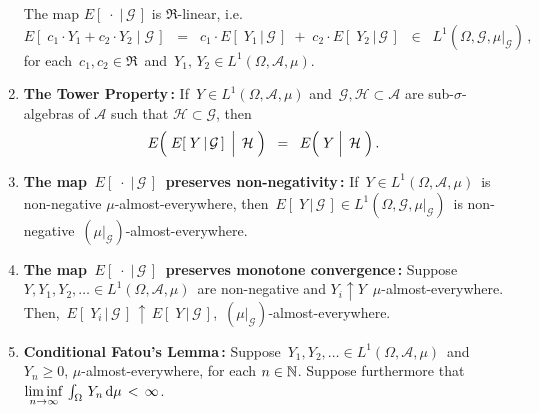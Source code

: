 \begin{theorem}
\begin{enumerate}
	The map $E\!\left[\;\cdot\;\vert\,\mathcal{G}\,\right]$ is $\Re$-linear, i.e.
	\begin{equation*}
	E\!\left[\;c_{1}\cdot Y_{1} + c_{2}\cdot Y_{2}\;\vert\;\mathcal{G}\,\right]
	\;\; = \;\;
	c_{1}\cdot E\!\left[\;Y_{1}\,\vert\,\mathcal{G}\,\right]
	\; + \;
	c_{2}\cdot E\!\left[\;Y_{2}\,\vert\,\mathcal{G}\,\right]
	\;\; \in \;\; L^{1}\!\left(\Omega,\mathcal{G},\mu\vert_{\mathcal{G}}\right)
	\,,
	\end{equation*}
	for each \,$c_{1}, c_{2} \in \Re$\, and \,$Y_{1}, \, Y_{2} \in L^{1}\!\left(\Omega,\mathcal{A},\mu\right)$.
\item\label{ConditionalExpectationTowerProperty}
	\textbf{The Tower Property\,:}
	\vskip 0.0cm
	If \,$Y \in L^{1}\!\left(\Omega,\mathcal{A},\mu\right)$
	and \,$\mathcal{G}, \mathcal{H} \subset \mathcal{A}$ are sub-$\sigma$-algebras of $\mathcal{A}$
	such that $\mathcal{H} \subset \mathcal{G}$, then
	\begin{equation*}
	E\!\left(\,\left.\overset{{\color{white}.}}{E}\!\left[\;Y\,\vert\,\mathcal{G}\,\right]\;\,\right\vert\;\mathcal{H}\;\right)
	\;\; = \;\;
	E\!\left(\,\left.\overset{{\color{white}.}}{Y}\;\right\vert\;\mathcal{H}\;\right).
	\end{equation*}	
\item\label{ConditionalExpectationPreservesNonnegativity}
	\textbf{The map \,$E\!\left[\;\cdot\;\vert\,\mathcal{G}\,\right]$\, preserves non-negativity\,:}
	\vskip 0.0cm
	If \,$Y \in L^{1}\!\left(\Omega,\mathcal{A},\mu\right)$\,
	is non-negative $\mu$-almost-everywhere, then
	\,$E\!\left[\;Y\,\vert\,\mathcal{G}\,\right] \in L^{1}\!\left(\Omega,\mathcal{G},\mu\vert_{\mathcal{G}}\right)$\,
	is non-negative \,$(\mu\vert_{\mathcal{G}})$-almost-everywhere.
\item\label{ConditionalMonotoneConvergence}
	\textbf{The map \,$E\!\left[\;\cdot\;\vert\,\mathcal{G}\,\right]$\, preserves monotone convergence\,:}
	\vskip 0.0cm
	Suppose \,$Y, Y_{1}, Y_{2}, \ldots \in L^{1}(\Omega,\mathcal{A},\mu)$\,
	are non-negative and
	\;$Y_{i} \uparrow Y$\,
	$\mu$-almost-everywhere.
	\vskip 0.0cm
	Then, \,$E\!\left[\;Y_{i}\,\vert\,\mathcal{G}\,\right] \,\uparrow\, E\!\left[\;Y\,\vert\,\mathcal{G}\,\right]$,\,
	$(\mu\vert_{\mathcal{G}})$-almost-everywhere.	
\item\label{ConditionalFatouLemma}
	\textbf{Conditional Fatou's Lemma\,:}
	\vskip 0.0cm
	Suppose \,$Y_{1}, Y_{2}, \ldots \in L^{1}(\Omega,\mathcal{A},\mu)$\,	and
	\,$Y_{n} \geq 0$, $\mu$-almost-everywhere, for each $n \in \mathbb{N}$.
	Suppose furthermore that
	\,$\underset{n\rightarrow\infty}{\liminf}\,\int_{\Omega}\, Y_{n} \,\textnormal{d}\mu \,<\, \infty$.\,

\end{enumerate}
\end{theorem}
